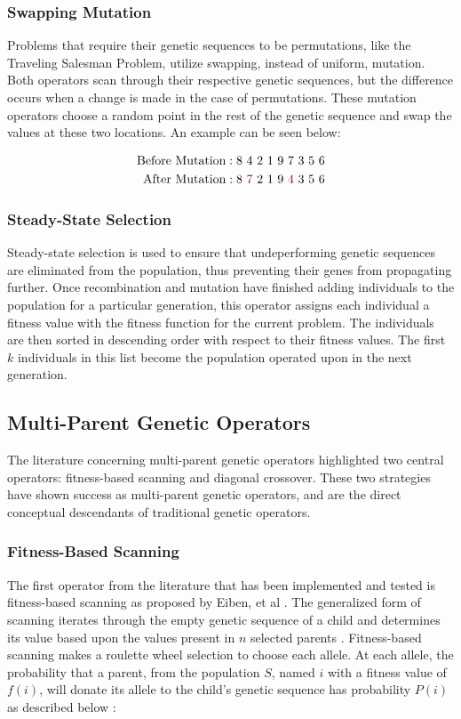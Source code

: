 \subsubsection*{Swapping Mutation}
Problems that require their genetic sequences to be permutations, like the Traveling Salesman Problem, utilize swapping, instead of uniform, mutation. Both operators scan through their respective genetic sequences, but the difference occurs when a change is made in the case of permutations. These mutation operators choose a random point in the rest of the genetic sequence and swap the values at these two locations. An example can be seen below:

\begin{align*}
\text{Before Mutation} &: 8~4~2~1~9~7~3~5~6 			\\
\text{After Mutation} &:  8~{\color{myred}7}~2~1~9~{\color{myred}4}~3~5~6		
\end{align*}

\subsubsection*{Steady-State Selection}
Steady-state selection is used to ensure that undeperforming genetic sequences are eliminated from the population, thus preventing their genes from propagating further. Once recombination and mutation have finished adding individuals to the population for a particular generation, this operator assigns each individual a fitness value with the fitness function for the current problem. The individuals are then sorted in descending order with respect to their fitness values. The first $k$ individuals in this list become the population operated upon in the next generation.

\subsection*{Multi-Parent Genetic Operators}
The literature concerning multi-parent genetic operators highlighted two central operators: fitness-based scanning and diagonal crossover. These two strategies have shown success as multi-parent genetic operators, and are the direct conceptual descendants of traditional genetic operators.

\subsubsection*{Fitness-Based Scanning}
The first operator from the literature that has been implemented and tested is fitness-based scanning as proposed by Eiben, et al \cite{Eiben94}. The generalized form of scanning iterates through the empty genetic sequence of a child and determines its value based upon the values present in $n$ selected parents \cite{Eiben91}. Fitness-based scanning makes a roulette wheel selection to choose each allele. At each allele, the probability that a parent, from the population $S$, named $i$ with a fitness value of $f(i)$, will donate its allele to the child's genetic sequence has probability $P(i)$ as described below \cite{Eiben94}: 

